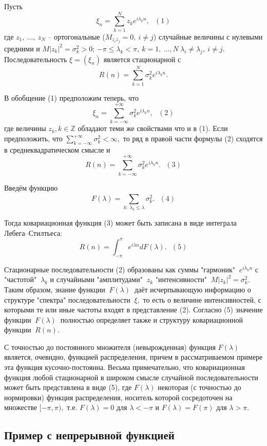 Пусть $$\xi_n = \sum_{k=1}^N z_k e^{i \lambda_{k}n}, \ \ \ (1)$$ где $z_1, \ ..., \ z_N $ -- ортогональные ($M_{z_i \overline{z}_j} = 0, \ i \neq j$) случайные величины с нулевыми средними и $M|z_k|^2 = \sigma^2_k > 0$; $-\pi \leq \lambda_k < \pi, \ k = 1, \ ..., N \ \lambda_i \neq \lambda_j, \ i \neq j$. Последовательность $\xi = (\xi_n)$ является стационарной с $$R(n) = \sum_{k=1}^N \sigma_k^2 e^{i \lambda_{k}n}.$$ 

В обобщение (1) предположим теперь, что $$\xi_n = \sum_{k= - \infty}^{+\infty}\sigma_k^2 e^{i \lambda_{k}n}, \ \ \ (2)$$ где величины $z_k, k \in \mathbb {Z}$ обладают теми же свойствами что и в (1). Если предположить, что $\sum_{k= - \infty}^{+\infty} \sigma_k^2 < \infty,$ то ряд в правой части формулы (2) сходятся в среднеквадратическом смысле и $$R(n) = \sum_{k= - \infty}^{+\infty}\sigma_k^2 e^{i \lambda_{k}n}. \ \ \ (3)$$

Введём функцию $$F(\lambda) = \sum_{k: \ \lambda_k \leq \lambda}^{} \sigma_k^2. \ \ \ (4)$$

Тогда ковариационная функция (3) может быть записана в виде интеграла Лебега--Стилтьеса:
$$R(n) = \int_{-\pi}^{\pi} e^{i\lambda n}dF(\lambda). \ \ \ (5)$$

Стационарные последовательности (2) образованы как суммы "гармоник" $\ e^{i \lambda_{k}n}$ с \\ "частотой" $\ \lambda_k$ и случайными "амплитудами" $\ z_k$ "интенсивности" $\ M|z_k|^2 = \sigma^2_k.$ Таким образом, знание функции $\ F(\lambda) \ $ даёт исчерпывающую информацию о структуре "спектра" последовательности $\ \xi,$ то есть о величине интенсивностей, с которыми те или иные частоты входят в представление (2). Согласно (5) значение функции $\ F(\lambda) \ $ полностью определяет также и структуру ковариационной функции $\ R(n).$

С точностью до постоянного множителя (невырожденная) функция $F(\lambda)$ является, очевидно, функцией распределения, причем в рассматриваемом примере эта функция кусочно-постоянна. Весьма примечательно, что ковариационная функция любой стационарной в широком смысле случайной последовательности может быть представлена в виде (5), где $F(\lambda)$ некоторая (с точностью до нормировки) функция распределения, носитель которой сосредоточен на множестве $[-\pi, \pi),$ т.е. $F(\lambda) = 0$ для $\lambda < -\pi$ и $F(\lambda) = F(\pi)$ для $\lambda > \pi.$

\subsection{Пример с непрерывной функцией}

